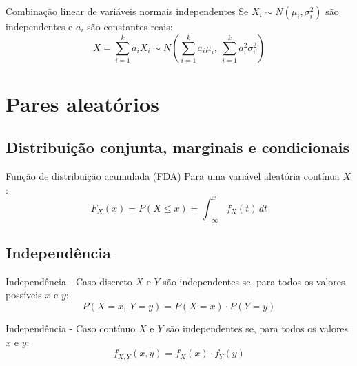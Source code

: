 \documentclass[a4paper,12pt]{article}
\begin{document}
\begin{formulabox}{Combinação linear de variáveis normais independentes}
Se $X_i \sim N(\mu_i, \sigma_i^2)$ são independentes e $a_i$ são constantes reais:
\begin{equation}\label{formula16}\tag{Fórmula 16}
    X = \sum_{i=1}^k a_i X_i \sim N\left(\sum_{i=1}^k a_i \mu_i,\ \sum_{i=1}^k a_i^2 \sigma_i^2\right)
\end{equation}
\end{formulabox}

\newpage

\section{\color{sectioncolor}Pares aleatórios}
\subsection{Distribuição conjunta, marginais e condicionais}

\begin{formulabox}{Função de distribuição acumulada (FDA)}
Para uma variável aleatória contínua $X$:
\begin{equation}\label{formula17}\tag{Fórmula 17}
    F_X(x) = P(X \leq x) = \int_{-\infty}^{x} f_X(t)\,dt
\end{equation}
\end{formulabox}

\subsection{Independência}

\begin{formulabox}{Independência - Caso discreto}
$X$ e $Y$ são independentes se, para todos os valores possíveis $x$ e $y$:
\begin{equation}\label{formula18}\tag{Fórmula 18}
    P(X = x,\ Y = y) = P(X = x) \cdot P(Y = y)
\end{equation}
\end{formulabox}

\begin{formulabox}{Independência - Caso contínuo}
$X$ e $Y$ são independentes se, para todos os valores $x$ e $y$:
\begin{equation}\label{formula19}\tag{Fórmula 19}
    f_{X,Y}(x, y) = f_X(x) \cdot f_Y(y)
\end{equation}
\end{formulabox}
\end{document}
